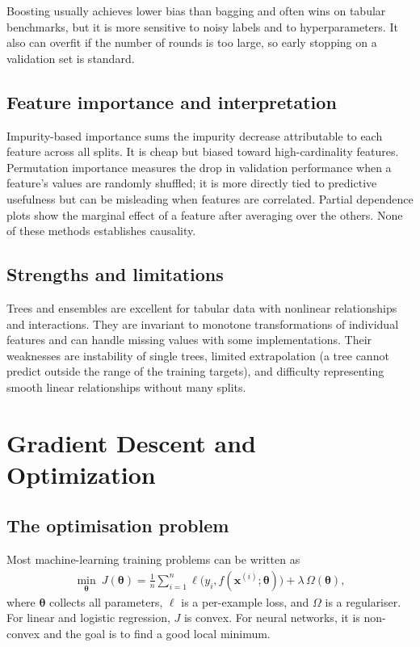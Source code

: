 \documentclass[a4paper, 12pt]{book}
\begin{document}
Boosting usually achieves lower bias than bagging and often wins on tabular
benchmarks, but it is more sensitive to noisy labels and to hyperparameters. It also
can overfit if the number of rounds is too large, so early stopping on a validation
set is standard.

\section{Feature importance and interpretation}

Impurity-based importance sums the impurity decrease attributable to each feature
across all splits. It is cheap but biased toward high-cardinality features.
Permutation importance measures the drop in validation performance when a feature's
values are randomly shuffled; it is more directly tied to predictive usefulness but
can be misleading when features are correlated. Partial dependence plots show the
marginal effect of a feature after averaging over the others. None of these methods
establishes causality.

\section{Strengths and limitations}

Trees and ensembles are excellent for tabular data with nonlinear relationships and
interactions. They are invariant to monotone transformations of individual features
and can handle missing values with some implementations. Their weaknesses are
instability of single trees, limited extrapolation (a tree cannot predict outside the
range of the training targets), and difficulty representing smooth linear
relationships without many splits.


\chapter{Gradient Descent and Optimization}
\label{ch:gd}

\section{The optimisation problem}

Most machine-learning training problems can be written as
\begin{align}
    \min_{\boldsymbol{\theta}}\
    J(\boldsymbol{\theta})
    = \frac{1}{n}\sum_{i=1}^n \ell\big(y_i, f(\mathbf{x}^{(i)};\boldsymbol{\theta})\big)
    + \lambda\,\Omega(\boldsymbol{\theta}),
\end{align}
where $\boldsymbol{\theta}$ collects all parameters, $\ell$ is a per-example loss, and
$\Omega$ is a regulariser. For linear and logistic regression, $J$ is convex. For
neural networks, it is non-convex and the goal is to find a good local minimum.
\end{document}
